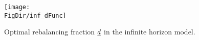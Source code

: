 \hypertarget{inf_dFunc}{}
\begin{figure}[tbp]
\centerline{\texttt{[image: \\FigDir/inf\_dFunc]}}
\caption{Optimal rebalancing fraction $\underline{d}$ in the infinite horizon model.}
\label{fig:inf_dFunc}
\end{figure}